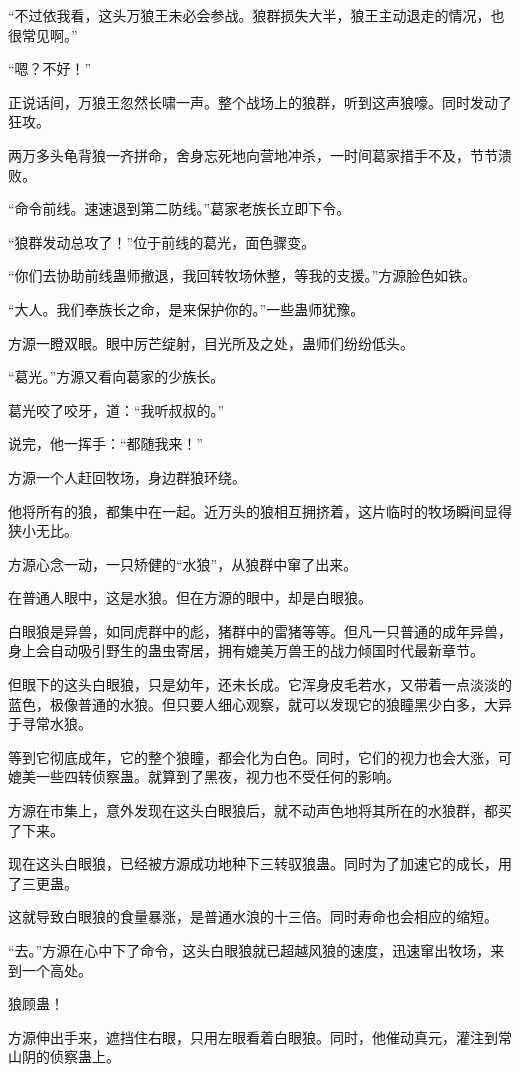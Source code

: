 \begin{this_body}
“不过依我看，这头万狼王未必会参战。狼群损失大半，狼王主动退走的情况，也很常见啊。”

“嗯？不好！”

正说话间，万狼王忽然长啸一声。整个战场上的狼群，听到这声狼嚎。同时发动了狂攻。

两万多头龟背狼一齐拼命，舍身忘死地向营地冲杀，一时间葛家措手不及，节节溃败。

“命令前线。速速退到第二防线。”葛家老族长立即下令。

“狼群发动总攻了！”位于前线的葛光，面色骤变。

“你们去协助前线蛊师撤退，我回转牧场休整，等我的支援。”方源脸色如铁。

“大人。我们奉族长之命，是来保护你的。”一些蛊师犹豫。

方源一瞪双眼。眼中厉芒绽射，目光所及之处，蛊师们纷纷低头。

“葛光。”方源又看向葛家的少族长。

葛光咬了咬牙，道：“我听叔叔的。”

说完，他一挥手：“都随我来！”

方源一个人赶回牧场，身边群狼环绕。

他将所有的狼，都集中在一起。近万头的狼相互拥挤着，这片临时的牧场瞬间显得狭小无比。

方源心念一动，一只矫健的“水狼”，从狼群中窜了出来。

在普通人眼中，这是水狼。但在方源的眼中，却是白眼狼。

白眼狼是异兽，如同虎群中的彪，猪群中的雷猪等等。但凡一只普通的成年异兽，身上会自动吸引野生的蛊虫寄居，拥有媲美万兽王的战力倾国时代最新章节。

但眼下的这头白眼狼，只是幼年，还未长成。它浑身皮毛若水，又带着一点淡淡的蓝色，极像普通的水狼。但只要人细心观察，就可以发现它的狼瞳黑少白多，大异于寻常水狼。

等到它彻底成年，它的整个狼瞳，都会化为白色。同时，它们的视力也会大涨，可媲美一些四转侦察蛊。就算到了黑夜，视力也不受任何的影响。

方源在市集上，意外发现在这头白眼狼后，就不动声色地将其所在的水狼群，都买了下来。

现在这头白眼狼，已经被方源成功地种下三转驭狼蛊。同时为了加速它的成长，用了三更蛊。

这就导致白眼狼的食量暴涨，是普通水浪的十三倍。同时寿命也会相应的缩短。

“去。”方源在心中下了命令，这头白眼狼就已超越风狼的速度，迅速窜出牧场，来到一个高处。

狼顾蛊！

方源伸出手来，遮挡住右眼，只用左眼看着白眼狼。同时，他催动真元，灌注到常山阴的侦察蛊上。


\end{this_body}
